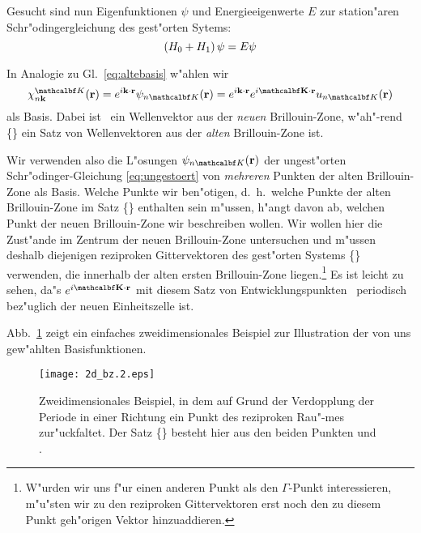 Gesucht sind nun Eigenfunktionen $\psi$ und Energieeigenwerte $E$ zur
station"aren Schr"odingergleichung des gest"orten Sytems:
%
\begin{equation}
  \label{eq:h0+h1}
  \left( \protect H_{0} + \protect H_{1} \right) \psi = E \psi
\end{equation}

In Analogie zu Gl.~\eqref{eq:altebasis} w"ahlen wir
%
\begin{equation}
  \label{eq:basis}
  \basis(\vec{r}) = e^{i\sprod{\nk}{r}} \psi_{n\set}(\vec{r})
  = e^{i\sprod{\nk}{r}} e^{i\sprod{\set}{r}} u_{n\set}(\vec{r})
\end{equation}
%
als Basis. Dabei ist \nk\ ein Wellenvektor aus der \emph{neuen}
Brillouin-Zone, w"ah"-rend \{\set\} ein Satz von Wellenvektoren aus der
\emph{alten} Brillouin-Zone ist.

Wir verwenden also die L"osungen $\psi_{n\set}(\vec{r})$ der ungest"orten
Schr"odinger-Gleichung \eqref{eq:ungestoert} von \emph{mehreren} Punkten der
alten Brillouin-Zone als Basis. Welche Punkte wir ben"otigen, d.~h.\ welche
Punkte der alten Brillouin-Zone im Satz \{\set\} enthalten sein m"ussen,
h"angt davon ab, welchen Punkt der neuen Brillouin-Zone wir beschreiben
wollen. Wir wollen hier die Zust"ande im Zentrum der neuen Brillouin-Zone
untersuchen und m"ussen deshalb diejenigen reziproken Gittervektoren des
gest"orten Systems \{\nG\} verwenden, die innerhalb der alten ersten
Brillouin-Zone liegen.\footnote{W"urden wir uns f"ur einen anderen Punkt als
  den $\Gamma$-Punkt interessieren, m"u"sten wir zu den reziproken
  Gittervektoren erst noch den zu diesem Punkt geh"origen Vektor
  hinzuaddieren.}  
Es ist leicht zu sehen, da"s $e^{i\sprod{\set}{r}}$ mit diesem Satz von
Entwicklungspunkten \set\ periodisch bez"uglich der neuen Einheitszelle ist.

Abb.~\ref{fig:2d_bz} zeigt ein einfaches zweidimensionales Beispiel zur
Illustration der von uns gew"ahlten Basisfunktionen. 
%
\begin{figure}[htb]
  \begin{minipage}[b]{85mm}
  \caption{Zweidimensionales Beispiel, in dem
    auf Grund der Verdopplung der Periode in einer Richtung ein Punkt des
    reziproken Rau"-mes zur"uckfaltet. Der Satz \{\set\} besteht hier aus den
    beiden Punkten  und .}
  \label{fig:2d_bz}
  \end{minipage}
  \hfill
  \texttt{[image: 2d\_bz.2.eps]}
\end{figure}
%


